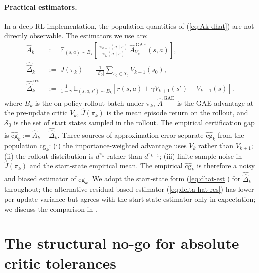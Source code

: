 \documentclass[11pt]{article}
\begin{document}
\paragraph{Practical estimators.}
In a deep RL implementation, the population quantities of (\ref{eq:Ak-dhat}) are not directly observable. The estimators we use are:
\begin{align}
\label{eq:Ak-est}
\widehat{A}_k
  &\;:=\; \mathbb{E}_{(s,a) \sim B_k}\!\left[\,
      \tfrac{\pi_{k+1}(a \mid s)}{\pi_k(a \mid s)}\,\hat A^{\,\mathrm{GAE}}_{V_k}(s, a)
    \right],\\[0.2em]
\label{eq:dhat-est}
\widehat{\hat\Delta}_k
  &\;:=\; \widehat{J}(\pi_k) \;-\; \tfrac{1}{|\mathcal{S}_0|}\sum_{s_0 \in \mathcal{S}_0} V_{k+1}(s_0), \\[0.2em]
\label{eq:delta-hat-res}
\widehat{\hat\Delta}^{\,\mathrm{res}}_k
  &\;:=\; \frac{1}{1-\gamma}\,\mathbb{E}_{(s,a,s') \sim B_k}\!\left[r(s,a) + \gamma V_{k+1}(s') - V_{k+1}(s)\right].
\end{align}
where $B_k$ is the on-policy rollout batch under $\pi_k$, $\hat A^{\,\mathrm{GAE}}$ is the GAE \citep{schulman2015high} advantage at the pre-update critic $V_k$, $\widehat{J}(\pi_k)$ is the mean episode return on the rollout, and $\mathcal{S}_0$ is the set of start states sampled in the rollout. The empirical certification gap is $\widehat{\mathrm{cg}}_k := \widehat{A}_k - \widehat{\hat\Delta}_k$. Three sources of approximation error separate $\widehat{\mathrm{cg}}_k$ from the population $\mathrm{cg}_k$: (i) the importance-weighted advantage uses $V_k$ rather than $V_{k+1}$; (ii) the rollout distribution is $d^{\pi_k}$ rather than $d^{\pi_{k+1}}$; (iii) finite-sample noise in $\widehat{J}(\pi_k)$ and the start-state empirical mean. The empirical $\widehat{\mathrm{cg}}_k$ is therefore a noisy and biased estimator of $\mathrm{cg}_k$. We adopt the start-state form (\ref{eq:dhat-est}) for $\widehat{\hat\Delta}_k$ throughout; the alternative residual-based estimator (\ref{eq:delta-hat-res}) has lower per-update variance but agrees with the start-state estimator only in expectation; we discuss the comparison in .



\section{The structural no-go for absolute critic tolerances}
\label{sec:theory}
\end{document}
